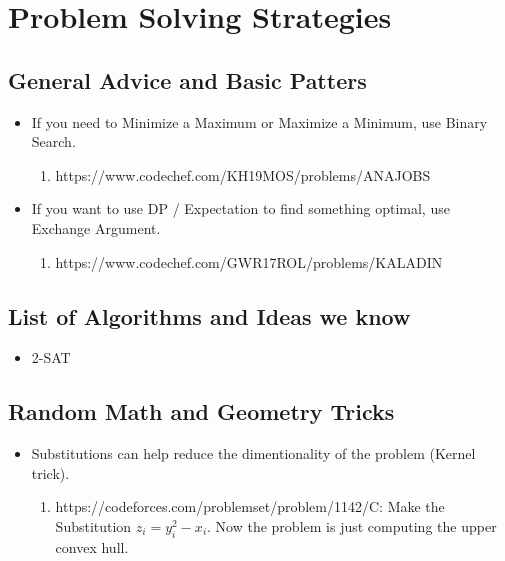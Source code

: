 \chapter{Problem Solving Strategies}


\section{General Advice and Basic Patters}

\begin{itemize}
    \item If you need to Minimize a Maximum or Maximize a Minimum, use Binary Search.
    \begin{enumerate}
        \item https://www.codechef.com/KH19MOS/problems/ANAJOBS
    \end{enumerate}
    \item If you want to use DP / Expectation to find something optimal, use Exchange Argument.
    \begin{enumerate}
        \item https://www.codechef.com/GWR17ROL/problems/KALADIN
    \end{enumerate}
\end{itemize}

\section{List of Algorithms and Ideas we know}

\begin{itemize}
    \item 2-SAT
\end{itemize}

\section{Random Math and Geometry Tricks}

\begin{itemize}
    \item Substitutions can help reduce the dimentionality of the problem (Kernel trick).
    \begin{enumerate}
        \item https://codeforces.com/problemset/problem/1142/C: Make the Substitution $z_{i} = y_{i}^{2} - x_{i}$. Now the problem is just computing the upper convex hull.
    \end{enumerate}
\end{itemize}

